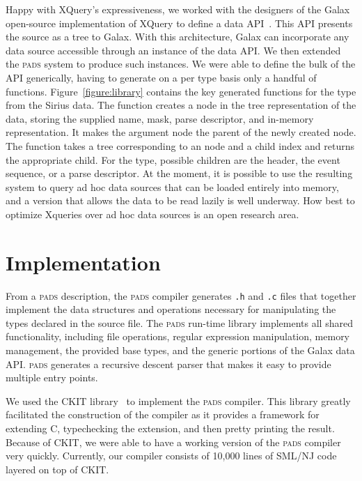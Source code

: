 \documentclass{sigplanconf}
\newcommand{\dibbler}{Sirius}
\newcommand{\figref}[1]{Figure~\ref{#1}}
\newcommand{\pads}{\textsc{pads}}
\newcommand{\C}{\textsc{C}}
\newcommand{\smlnj}{\textsc{SML/NJ}}
\begin{document}
Happy with XQuery's expressiveness, we worked with the designers of the Galax~\cite{galax} open-source implementation of XQuery to define a data API~\cite{galaxmanual}. 
This API presents the source as a tree to Galax. With this architecture, Galax can incorporate any data source accessible through an instance of the data API.  We then extended the \pads{} system to produce such instances.  We were able to define the bulk of the API generically, having to generate on a per type basis only a handful of functions. 
\figref{figure:library} contains the key generated functions for the  type from the \dibbler{} data.    The   function creates a node in the tree representation of the data, storing the supplied name, mask, parse descriptor, and in-memory representation.  It makes the argument node the parent of the newly created node.
The  function takes a tree
corresponding to an  node and a child index and returns the appropriate child.  For the  type, possible children are the header, the event sequence, or a parse descriptor. 
At the moment, it is possible to use the resulting system to query ad hoc data sources that can be loaded entirely into memory, and a version that allows the data to be read lazily is well underway.
How best to optimize Xqueries over ad hoc data sources is an open research area.

\section{Implementation}
From a \pads{} description, the \pads{} compiler generates \texttt{.h} and
\texttt{.c} files that together implement the data structures and operations 
necessary for manipulating the types declared in the source file.  The
\pads{} run-time library implements all shared functionality, including file operations, regular expression manipulation, memory management, the provided base types, and the generic portions of the Galax data API.  \pads{} generates a recursive descent parser that makes it easy to provide multiple entry points.

We used the CKIT library~\cite{ckit} to implement the \pads{} compiler.
This library greatly facilitated the construction of the compiler as it
provides a framework for extending \C{}, typechecking the extension, and then pretty printing the result.  Because of CKIT, we were able to have a working version of the \pads{} compiler very quickly.
Currently, our compiler consists of 10,000 lines of \smlnj{} code layered on top of CKIT.
\end{document}
